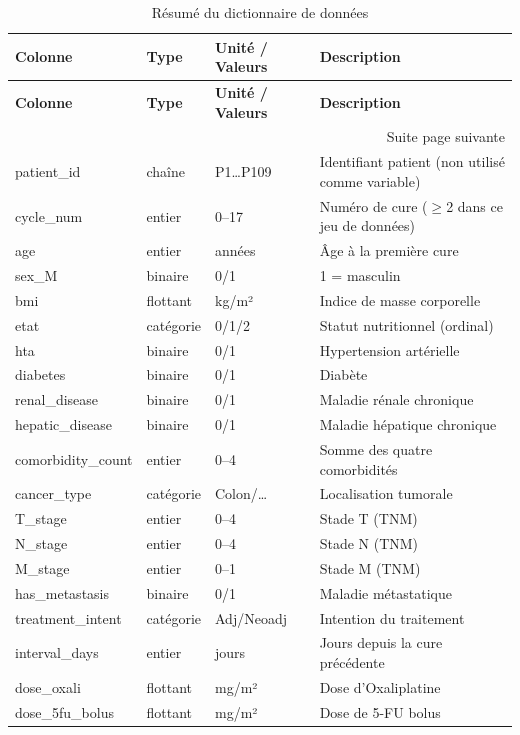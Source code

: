 \documentclass[12pt,a4paper]{report}
\begin{document}
\begin{longtable}{p{3.5cm}p{1.5cm}p{2.5cm}p{5.5cm}}
\caption{Résumé du dictionnaire de données} \label{tab:dict} \\
\toprule
\textbf{Colonne} & \textbf{Type} & \textbf{Unité / Valeurs} & \textbf{Description} \\
\midrule
\endfirsthead
\toprule \textbf{Colonne} & \textbf{Type} & \textbf{Unité / Valeurs} & \textbf{Description} \\ \midrule
\endhead
\midrule \multicolumn{4}{r}{\small Suite page suivante} \\
\endfoot
\bottomrule
\endlastfoot
patient\_id & chaîne & P1\ldots P109 & Identifiant patient (non utilisé comme variable) \\
cycle\_num & entier & 0--17 & Numéro de cure ($\geq$2 dans ce jeu de données) \\
age & entier & années & Âge à la première cure \\
sex\_M & binaire & 0/1 & 1 = masculin \\
bmi & flottant & kg/m² & Indice de masse corporelle \\
etat & catégorie & 0/1/2 & Statut nutritionnel (ordinal) \\
hta & binaire & 0/1 & Hypertension artérielle \\
diabetes & binaire & 0/1 & Diabète \\
renal\_disease & binaire & 0/1 & Maladie rénale chronique \\
hepatic\_disease & binaire & 0/1 & Maladie hépatique chronique \\
comorbidity\_count & entier & 0--4 & Somme des quatre comorbidités \\
cancer\_type & catégorie & Colon/\ldots & Localisation tumorale \\
T\_stage & entier & 0--4 & Stade T (TNM) \\
N\_stage & entier & 0--4 & Stade N (TNM) \\
M\_stage & entier & 0--1 & Stade M (TNM) \\
has\_metastasis & binaire & 0/1 & Maladie métastatique \\
treatment\_intent & catégorie & Adj/Neoadj & Intention du traitement \\
interval\_days & entier & jours & Jours depuis la cure précédente \\
dose\_oxali & flottant & mg/m² & Dose d'Oxaliplatine \\
dose\_5fu\_bolus & flottant & mg/m² & Dose de 5-FU bolus \\

\end{longtable}
\end{document}
